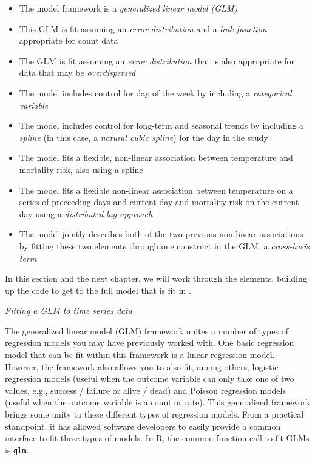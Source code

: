 \documentclass[
]{book}
\providecommand{\tightlist}{%
  \setlength{\itemsep}{0pt}\setlength{\parskip}{0pt}}
\begin{document}
\begin{itemize}
\tightlist
\item
  The model framework is a \emph{generalized linear model (GLM)}
\item
  This GLM is fit assuming an \emph{error distribution} and a \emph{link function}
  appropriate for count data
\item
  The GLM is fit assuming an \emph{error distribution} that is also appropriate for
  data that may be \emph{overdispersed}
\item
  The model includes control for day of the week by including a \emph{categorical
  variable}
\item
  The model includes control for long-term and seasonal trends by including
  a \emph{spline} (in this case, a \emph{natural cubic spline}) for the day in the study
\item
  The model fits a flexible, non-linear association between temperature
  and mortality risk, also using a spline
\item
  The model fits a flexible non-linear association between temperature on
  a series of preceeding days and current day and mortality risk on the
  current day using a \emph{distributed lag approach}
\item
  The model jointly describes both of the two previous non-linear associations
  by fitting these two elements through one construct in the GLM, a
  \emph{cross-basis term}
\end{itemize}

In this section and the next chapter, we will work through the elements,
building up the code to get to the full model that is fit in \citet{vicedo2019hands}.

\emph{Fitting a GLM to time series data}

The generalized linear model (GLM) framework unites a number of types of
regression models you may have previously worked with. One basic regression
model that can be fit within this framework is a linear regression model.
However, the framework also allows you to also fit, among others, logistic
regression models (useful when the outcome variable can only take one of two
values, e.g., success / failure or alive / dead) and Poisson regression models
(useful when the outcome variable is a count or rate). This generalized
framework brings some unity to these different types of regression models. From
a practical standpoint, it has allowed software developers to easily provide a
common interface to fit these types of models. In R, the common function call to
fit GLMs is \texttt{glm}.
\end{document}
